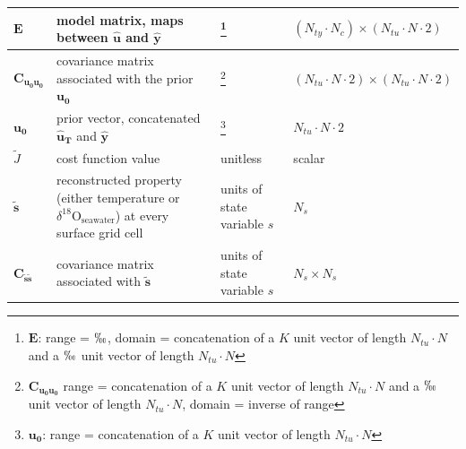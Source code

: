 \documentclass[draft]{agujournal2019}
\begin{document}
\begin{longtable}{| p{0.75in}|p{3.5in}|p{1in}|p{1in} |}
  \hline
  $\mathbf{E}$ & model matrix, maps between $\mathbf{\hat{u}}$ and $\mathbf{\hat{y}}$&  \footnote{$\mathbf{E}$: range = $\permil$, domain = concatenation of a $K$ unit vector of length $N_{tu} \cdot N$ and a $\permil$ unit vector of length $N_{tu} \cdot N$} & $(N_{ty} \cdot N_{c}) \times (N_{tu} \cdot N \cdot 2) $\\
  \hline
  $\mathbf{C_{u_{0}u_{0}}}$ & covariance matrix associated with the prior $\mathbf{u_{0}}$& \footnote{$\mathbf{C_{u_{0}u_{0}}}$ range = concatenation of a $K$ unit vector of length $N_{tu} \cdot N$ and a $\permil$ unit vector of length $N_{tu} \cdot N$, domain = inverse of range}& $(N_{tu} \cdot N \cdot 2) \times (N_{tu} \cdot N \cdot 2)$\\
    \hline
  $\mathbf{u_{0}}$ & prior vector, concatenated $\mathbf{\hat{u}_{T}}$ and $\mathbf{\hat{y}}$& \footnote{$\mathbf{u_{0}}$: range = concatenation of a $K$ unit vector of length $N_{tu} \cdot N$}& $N_{tu} \cdot N \cdot 2$ \\                                            
  \hline
  $\tilde{J}$ & cost function value & unitless & scalar \\
  \hline
  $\mathbf{\tilde{s}}$ & reconstructed property (either temperature or $\delta^{18}\mathrm{O}_{\mathrm{seawater}}$) at every surface grid cell & units of state variable $s$ & $N_{s}$ \\
  \hline
  $\mathbf{C_{\tilde{s}\tilde{s}}}$ & covariance matrix associated with $\mathbf{\tilde{s}}$ & units of state variable $s$ & $N_{s} \times N_{s}$ \\
  \hline
\end{longtable}

\clearpage

 

\clearpage
\end{document}

